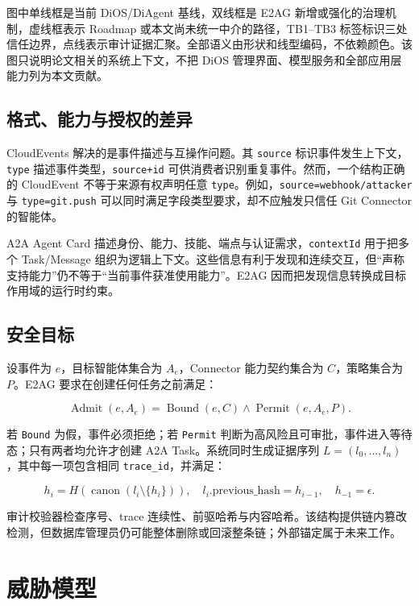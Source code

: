 图中单线框是当前 DiOS/DiAgent 基线，双线框是 E2AG 新增或强化的治理机制，虚线框表示 Roadmap 或本文尚未统一中介的路径，TB1--TB3 标签标识三处信任边界，点线表示审计证据汇聚。全部语义由形状和线型编码，不依赖颜色。该图只说明论文相关的系统上下文，不把 DiOS 管理界面、模型服务和全部应用层能力列为本文贡献。

\subsection{格式、能力与授权的差异}\label{22-ux683cux5f0fux80fdux529bux4e0eux6388ux6743ux7684ux5deeux5f02}

CloudEvents 解决的是事件描述与互操作问题。其 \texttt{source} 标识事件发生上下文，\texttt{type} 描述事件类型，\texttt{source+id} 可供消费者识别重复事件。然而，一个结构正确的 CloudEvent 不等于来源有权声明任意 \texttt{type}。例如，\texttt{source=webhook/attacker} 与 \texttt{type=git.push} 可以同时满足字段类型要求，却不应触发只信任 Git Connector 的智能体。

A2A Agent Card 描述身份、能力、技能、端点与认证需求，\texttt{contextId} 用于把多个 Task/Message 组织为逻辑上下文。这些信息有利于发现和连续交互，但``声称支持能力''仍不等于``当前事件获准使用能力''。E2AG 因而把发现信息转换成目标作用域的运行时约束。

\subsection{安全目标}\label{23-ux5b89ux5168ux76eeux6807}

设事件为 \(e\)，目标智能体集合为 \(A_e\)，Connector 能力契约集合为 \(C\)，策略集合为 \(P\)。E2AG 要求在创建任何任务之前满足：

\[
\operatorname{Admit}(e,A_e)=\operatorname{Bound}(e,C)\land\operatorname{Permit}(e,A_e,P).
\]

若 \texttt{Bound} 为假，事件必须拒绝；若 \texttt{Permit} 判断为高风险且可审批，事件进入等待态；只有两者均允许才创建 A2A Task。系统同时生成证据序列 \(L=(l_0,\ldots,l_n)\)，其中每一项包含相同 \texttt{trace\_id}，并满足：

\[
h_i=H(\operatorname{canon}(l_i\setminus\{h_i\})),\quad l_i.\mathrm{previous\_hash}=h_{i-1},\quad h_{-1}=\epsilon.
\]

审计校验器检查序号、trace 连续性、前驱哈希与内容哈希。该结构提供链内篡改检测，但数据库管理员仍可能整体删除或回滚整条链；外部锚定属于未来工作。

\section{威胁模型}\label{sec:threat-model}

